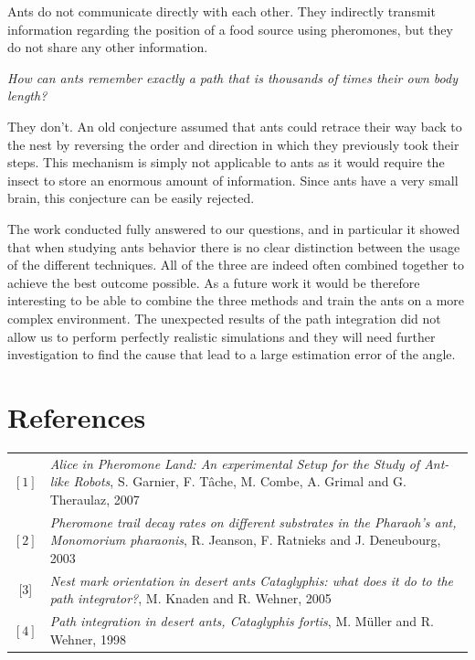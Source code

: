 \documentclass[11pt]{article}
\begin{document}
Ants do not communicate directly with each other. They indirectly transmit information regarding the position of a food source using pheromones, but they do not share any other information.

\begin{center}
	\emph{How can ants remember exactly a path that is thousands of times their own body length?}
\end{center}

They don't. An old conjecture assumed that ants could retrace their way back to the nest by reversing the order and direction in which they previously took their steps. This mechanism is simply not applicable to ants as it would require the insect to store an enormous amount of information. Since ants have a very small brain, this conjecture can be easily rejected.

The work conducted fully answered to our questions, and in particular it showed that when studying ants behavior there is no clear distinction between the usage of the different techniques. All of the three are indeed often combined together to achieve the best outcome possible. As a future work it would be therefore interesting to be able to combine the three methods and train the ants on a more complex environment. The unexpected results of the path integration did not allow us to perform perfectly realistic simulations and they will need further investigation to find the cause that lead to a large estimation error of the angle.

\section{References}

\begin{tabular}{ c p{14cm}}
  $[1]$ & \emph{Alice in Pheromone Land: An experimental Setup for the Study of Ant-like Robots}, S. Garnier, F. T\^{a}che, M. Combe, A. Grimal and G. Theraulaz, 2007 \\
  $[2]$& \emph{Pheromone trail decay rates on different substrates in the Pharaoh's ant, Monomorium pharaonis}, R. Jeanson, F. Ratnieks and J. Deneubourg, 2003  \\
  $[3$] & \emph{Nest mark orientation in desert ants Cataglyphis: what does it do to the path integrator?}, M. Knaden and R. Wehner, 2005  \\
  $[4]$ & \emph{Path integration in desert ants, Cataglyphis fortis}, M. M\"{u}ller and R. Wehner, 1998  \\
\end{tabular}
\end{document}
